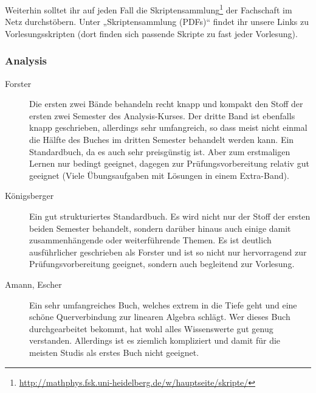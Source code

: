Weiterhin solltet ihr auf jeden Fall die Skriptensammlung\footnote{\url{http://mathphys.fsk.uni-heidelberg.de/w/hauptseite/skripte/}} der Fachschaft im Netz durchstöbern. Unter „Skriptensammlung (PDFs)“ findet ihr unsere Links zu Vorlesungsskripten (dort finden sich passende Skripte zu fast jeder Vorlesung).

\subsubsection{Analysis}
\begin{description}
\item[Forster]{
		Die ersten zwei Bände behandeln recht knapp und kompakt den Stoff der ersten zwei Semester des Analysis-Kurses. Der dritte Band ist ebenfalls knapp geschrieben, allerdings sehr umfangreich, so dass meist nicht einmal die Hälfte des Buches im dritten Semester behandelt werden kann. Ein Standardbuch, da es auch sehr preisgünstig ist. Aber zum erstmaligen Lernen nur bedingt geeignet, dagegen zur Prüfungsvorbereitung relativ gut geeignet (Viele Übungsaufgaben mit Lösungen in einem Extra-Band).}

\item[Königsberger]{
		Ein gut strukturiertes Standardbuch. Es wird nicht nur der Stoff der ersten beiden Semester behandelt, sondern darüber hinaus auch einige damit zusammenhängende oder weiterführende Themen. Es ist deutlich ausführlicher geschrieben als Forster und ist so nicht nur hervorragend zur Prüfungsvorbereitung geeignet, sondern auch begleitend zur Vorlesung.}

\item[Amann, Escher]{
		Ein sehr umfangreiches Buch, welches extrem in die Tiefe geht und eine schöne Querverbindung zur linearen Algebra schlägt. Wer dieses Buch durchgearbeitet bekommt, hat wohl alles Wissenswerte gut genug verstanden. Allerdings ist es ziemlich kompliziert und damit für die meisten Studis als erstes Buch nicht geeignet.}
\end{description}



